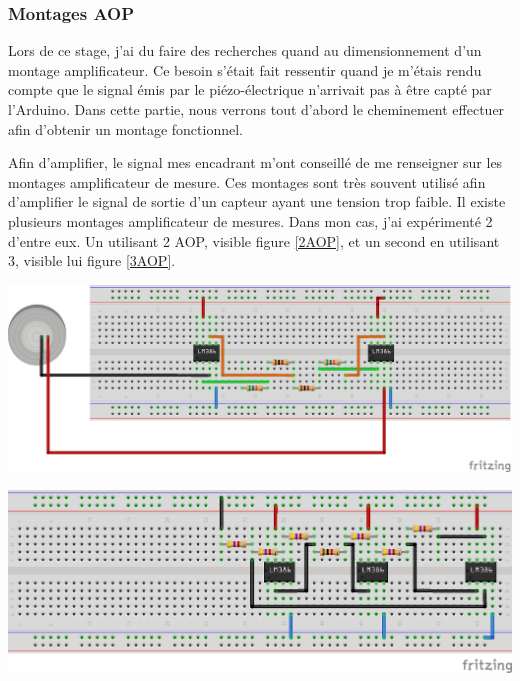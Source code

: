 \documentclass[12pt,french,a4paper]{article}
\begin{document}
\subsubsection{Montages AOP}
Lors de ce stage, j'ai du faire des recherches quand au dimensionnement d'un montage amplificateur. Ce besoin s'était fait ressentir quand je m'étais rendu compte que le signal émis par le piézo-électrique n'arrivait pas à être capté par l'Arduino.  Dans cette partie, nous verrons tout d'abord le cheminement effectuer afin d'obtenir un montage fonctionnel. 

Afin d'amplifier, le signal mes encadrant m'ont conseillé de me renseigner sur les montages amplificateur de mesure. Ces montages sont très souvent utilisé afin d’amplifier le signal de sortie d’un capteur ayant une tension trop faible.
Il existe plusieurs montages amplificateur de mesures. Dans mon cas, j’ai expérimenté 2 d'entre eux. Un utilisant 2 AOP, visible figure \ref{2AOP}, et un second en utilisant 3, visible lui figure \ref{3AOP}. 

\begin{center}	
\includegraphics[scale=0.80]{../img/instrumentation2aop_bb.png}
\label{2AOP}
\end{center}

\begin{center}	
\includegraphics[scale=1]{../img/instrumentation3aop_bb.png}
\label{3AOP}
\end{center}
\end{document}
